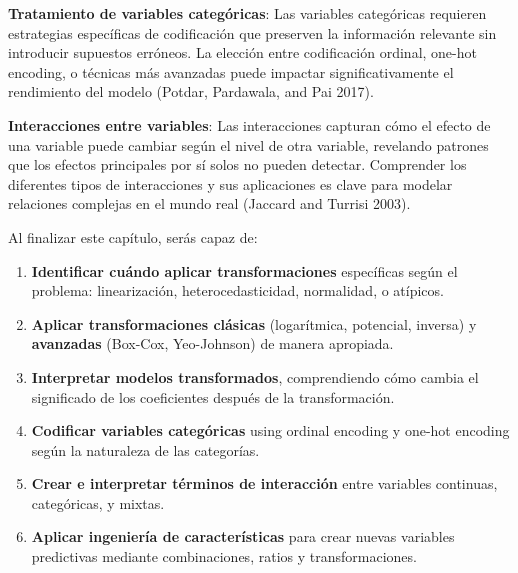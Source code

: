 \documentclass[
  letterpaper,
  DIV=11,
  numbers=noendperiod]{scrreprt}
\providecommand{\tightlist}{%
  \setlength{\itemsep}{0pt}\setlength{\parskip}{0pt}}
\begin{document}
\textbf{Tratamiento de variables categóricas}: Las variables categóricas
requieren estrategias específicas de codificación que preserven la
información relevante sin introducir supuestos erróneos. La elección
entre codificación ordinal, one-hot encoding, o técnicas más avanzadas
puede impactar significativamente el rendimiento del modelo (Potdar,
Pardawala, and Pai 2017).

\textbf{Interacciones entre variables}: Las interacciones capturan cómo
el efecto de una variable puede cambiar según el nivel de otra variable,
revelando patrones que los efectos principales por sí solos no pueden
detectar. Comprender los diferentes tipos de interacciones y sus
aplicaciones es clave para modelar relaciones complejas en el mundo real
(Jaccard and Turrisi 2003).

\begin{tcolorbox}[enhanced jigsaw, breakable, toprule=.15mm, bottomtitle=1mm, coltitle=black, colbacktitle=quarto-callout-important-color!10!white, titlerule=0mm, opacitybacktitle=0.6, bottomrule=.15mm, toptitle=1mm, title=\textcolor{quarto-callout-important-color}{\faExclamation}\hspace{0.5em}{Objetivos de aprendizaje}, arc=.35mm, rightrule=.15mm, opacityback=0, colframe=quarto-callout-important-color-frame, leftrule=.75mm, left=2mm, colback=white]

Al finalizar este capítulo, serás capaz de:

\begin{enumerate}
\def\labelenumi{\arabic{enumi}.}
\tightlist
\item
  \textbf{Identificar cuándo aplicar transformaciones} específicas según
  el problema: linearización, heterocedasticidad, normalidad, o
  atípicos.
\item
  \textbf{Aplicar transformaciones clásicas} (logarítmica, potencial,
  inversa) y \textbf{avanzadas} (Box-Cox, Yeo-Johnson) de manera
  apropiada.
\item
  \textbf{Interpretar modelos transformados}, comprendiendo cómo cambia
  el significado de los coeficientes después de la transformación.
\item
  \textbf{Codificar variables categóricas} using ordinal encoding y
  one-hot encoding según la naturaleza de las categorías.
\item
  \textbf{Crear e interpretar términos de interacción} entre variables
  continuas, categóricas, y mixtas.
\item
  \textbf{Aplicar ingeniería de características} para crear nuevas
  variables predictivas mediante combinaciones, ratios y
  transformaciones.
\end{enumerate}

\end{tcolorbox}
\end{document}
